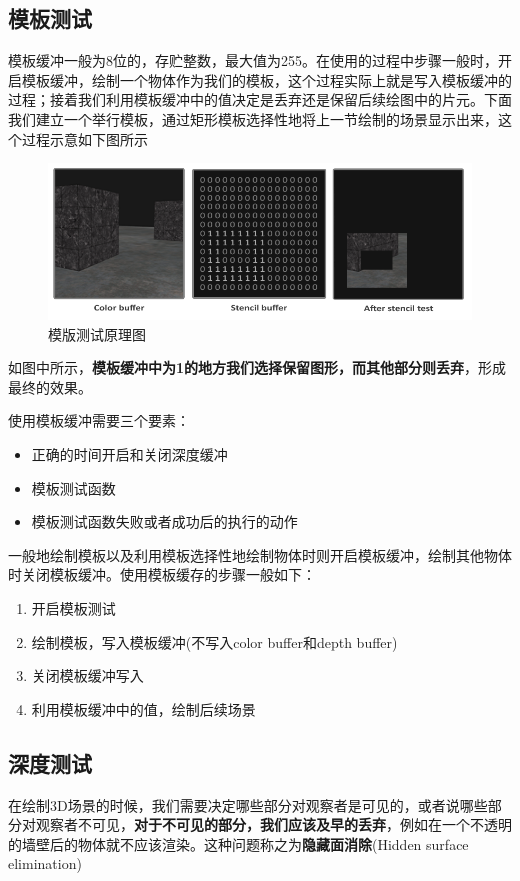 \documentclass[UTF8,a4paper,12pt]{ctexbook}
\begin{document}
			
		\subsection{模板测试}
			模板缓冲一般为8位的，存贮整数，最大值为255。在使用的过程中步骤一般时，开启模板缓冲，绘制一个物体作为我们的模板，这个过程实际上就是写入模板缓冲的过程；接着我们利用模板缓冲中的值决定是丢弃还是保留后续绘图中的片元。下面我们建立一个举行模板，通过矩形模板选择性地将上一节绘制的场景显示出来，这个过程示意如下图所示
				\begin{figure}[H]
					\centering
					\includegraphics[scale=0.7]{Stencil-Test}
					\caption{模版测试原理图}
				\end{figure}
			
			如图中所示，\textbf{模板缓冲中为1的地方我们选择保留图形，而其他部分则丢弃}，形成最终的效果。
			
			使用模板缓冲需要三个要素：
				\begin{itemize}
					\item 正确的时间开启和关闭深度缓冲
					\item 模板测试函数
					\item 模板测试函数失败或者成功后的执行的动作	
				\end{itemize}
			
			一般地绘制模板以及利用模板选择性地绘制物体时则开启模板缓冲，绘制其他物体时关闭模板缓冲。使用模板缓存的步骤一般如下：
				\begin{enumerate}
					\item 开启模板测试
					\item 绘制模板，写入模板缓冲(不写入color buffer和depth buffer)
					\item 关闭模板缓冲写入
					\item 利用模板缓冲中的值，绘制后续场景
				\end{enumerate}	
		\subsection{深度测试}
			在绘制3D场景的时候，我们需要决定哪些部分对观察者是可见的，或者说哪些部分对观察者不可见，\textbf{对于不可见的部分，我们应该及早的丢弃}，例如在一个不透明的墙壁后的物体就不应该渲染。这种问题称之为\textbf{隐藏面消除}(Hidden surface elimination)
		
\end{document}
